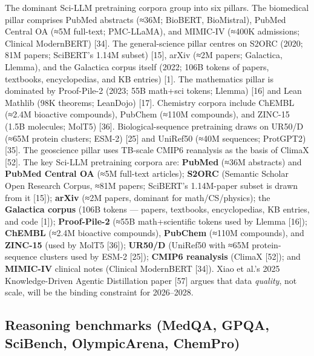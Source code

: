 The dominant Sci-LLM pretraining corpora group into six pillars. The biomedical pillar comprises PubMed abstracts (≈36M; BioBERT, BioMistral), PubMed Central OA (≈5M full-text; PMC-LLaMA), and MIMIC-IV (≈400K admissions; Clinical ModernBERT) {[}34{]}. The general-science pillar centres on S2ORC (2020; 81M papers; SciBERT's 1.14M subset) {[}15{]}, arXiv (≈2M papers; Galactica, Llemma), and the Galactica corpus itself (2022; 106B tokens of papers, textbooks, encyclopedias, and KB entries) {[}1{]}. The mathematics pillar is dominated by Proof-Pile-2 (2023; 55B math+sci tokens; Llemma) {[}16{]} and Lean Mathlib (98K theorems; LeanDojo) {[}17{]}. Chemistry corpora include ChEMBL (≈2.4M bioactive compounds), PubChem (≈110M compounds), and ZINC-15 (1.5B molecules; MolT5) {[}36{]}. Biological-sequence pretraining draws on UR50/D (≈65M protein clusters; ESM-2) {[}25{]} and UniRef50 (≈40M sequences; ProtGPT2) {[}35{]}. The geoscience pillar uses TB-scale CMIP6 reanalysis as the basis of ClimaX {[}52{]}. The key Sci-LLM pretraining corpora are: \textbf{PubMed} (≈36M abstracts) and \textbf{PubMed Central OA} (≈5M full-text articles); \textbf{S2ORC} (Semantic Scholar Open Research Corpus, ≈81M papers; SciBERT's 1.14M-paper subset is drawn from it {[}15{]}); \textbf{arXiv} (≈2M papers, dominant for math/CS/physics); the \textbf{Galactica corpus} (106B tokens --- papers, textbooks, encyclopedias, KB entries, and code {[}1{]}); \textbf{Proof-Pile-2} (≈55B math+scientific tokens used by Llemma {[}16{]}); \textbf{ChEMBL} (≈2.4M bioactive compounds), \textbf{PubChem} (≈110M compounds), and \textbf{ZINC-15} (used by MolT5 {[}36{]}); \textbf{UR50/D} (UniRef50 with ≈65M protein-sequence clusters used by ESM-2 {[}25{]}); \textbf{CMIP6 reanalysis} (ClimaX {[}52{]}); and \textbf{MIMIC-IV} clinical notes (Clinical ModernBERT {[}34{]}). Xiao et al.'s 2025 Knowledge-Driven Agentic Distillation paper {[}57{]} argues that data \emph{quality}, not scale, will be the binding constraint for 2026--2028.

\subsection{Reasoning benchmarks (MedQA, GPQA, SciBench, OlympicArena, ChemPro)}\label{reasoning-benchmarks-medqa-gpqa-scibench-olympicarena-chempro}

